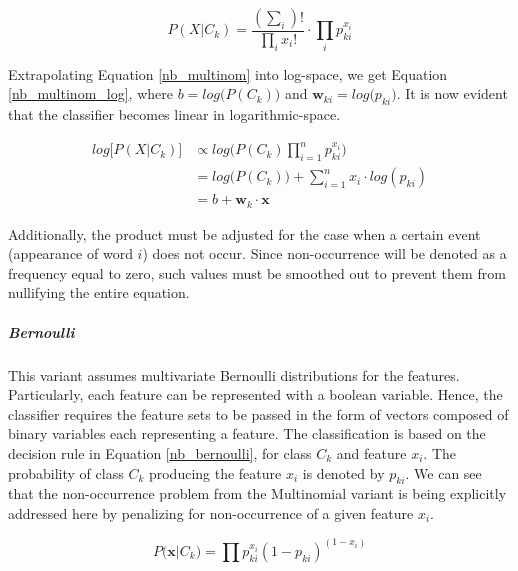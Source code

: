 	\begin{equation}
		P(X|C_k) = \frac{(\sum_i)!}{\prod_i x_i !} \cdot \prod_i p_{ki}^{x_i}
		\label{nb_multinom}
	\end{equation}
	
		Extrapolating Equation \ref{nb_multinom} into log-space, we get Equation \ref{nb_multinom_log}, where $ b = log \big( P(C_k)\big) $ and $ \textbf{w}_{ki} = log \big( p_{ki} \big) $. It is now evident that the classifier becomes linear in logarithmic-space.
	
	\begin{equation}
		\begin{aligned}
			log \big[ P(X|C_k) \big] &\propto log \bigg( P(C_k)\prod_{i=1}^n p_{ki}^{x_i} \bigg) \\
			&= log \bigg(P(C_k) \bigg) + \sum_{i=1}^n x_i \cdot log(p_{ki}) \\
			&= b + \textbf{w}_k \cdot \textbf{x} 
		\end{aligned}
		\label{nb_multinom_log}
	\end{equation}
		
		Additionally, the product must be adjusted for the case when a certain event (appearance of word $ i $) does not occur. Since non-occurrence will be denoted as a frequency equal to zero, such values must be smoothed out to prevent them from nullifying the entire equation.
	
	\subparagraph{Bernoulli}
		This variant assumes multivariate Bernoulli distributions for the features. Particularly, each feature can be represented with a boolean variable. Hence, the classifier requires the feature sets to be passed in the form of vectors composed of binary variables each representing a feature. The classification is based on the decision rule in Equation \ref{nb_bernoulli}, for class $ C_k $ and feature $ x_i $. The probability of class $ C_k $ producing the feature $ x_i $ is denoted by $ p_{ki} $. We can see that the non-occurrence problem from the Multinomial variant is being explicitly addressed here by penalizing for non-occurrence of a given feature $ x_i $.
	
	\begin{equation}
		P \big(\textbf{x}|C_k \big) = \prod p_{ki}^{x_i}(1-p_{ki})^{(1-x_i)}
		\label{nb_bernoulli}
	\end{equation}
	
	\newpage